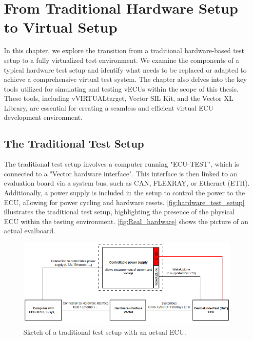 
\chapter{From Traditional Hardware Setup to Virtual Setup}\label{chapter:simulation}
In this chapter, we explore the transition from a traditional hardware-based test setup to a fully virtualized test environment. We examine the components of a typical hardware test setup and identify what needs to be replaced or adapted to achieve a comprehensive virtual test system. The chapter also delves into the key tools utilized for simulating and testing vECUs within the scope of this thesis. These tools, including vVIRTUALtarget, Vector SIL Kit, and the Vector XL Library, are essential for creating a seamless and efficient virtual ECU development environment.


\section{The Traditional Test Setup}
The traditional test setup involves a computer running "ECU-TEST", which is connected to a "Vector hardware interface". This interface is then linked to an evaluation board via a system bus, such as CAN, FLEXRAY, or Ethernet (ETH). Additionally, a power supply is included in the setup to control the power to the ECU, allowing for power cycling and hardware resets. \autoref{fig:hardware_test_setup} illustrates the traditional test setup, highlighting the presence of the physical ECU within the testing environment. \autoref{fig:Real_hardware} shows the picture of an actual evalboard.



\begin{figure}[htpb]
  \centering
  \includegraphics[width=1\textwidth]{figures/Hardware_setup.PNG}
  \caption{Sketch of a traditional test setup with an actual ECU.} \label{fig:hardware_test_setup}
\end{figure}

